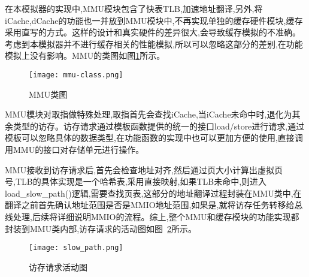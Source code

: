 

在本模拟器的实现中,MMU模块包含了快表TLB,加速地址翻译,另外,将iCache,dCache的功能也一并放到MMU模块中,不再实现单独的缓存硬件模块,缓存采用直写的方式。这样的设计和真实硬件的差异很大,会导致缓存模拟的不准确。考虑到本模拟器并不进行缓存相关的性能模拟,所以可以忽略这部分的差别,在功能模拟上没有影响。MMU的类图如图\ref{fig:mmu-class}所示。
\begin{figure}[H]
    \centering
    \texttt{[image: mmu-class.png]}
    \caption{MMU类图}
    \label{fig:mmu-class}
\end{figure}

MMU模块对取指做特殊处理,取指首先会查找iCache,当iCache未命中时,退化为其余类型的访存。访存请求通过模板函数提供的统一的接口load/store进行请求,通过模板可以忽略具体的数据类型,在功能函数的实现中也可以更加方便的使用,直接调用MMU的接口对存储单元进行操作。



MMU接收到访存请求后,首先会检查地址对齐,然后通过页大小计算出虚拟页号,TLB的具体实现是一个哈希表,采用直接映射,如果TLB未命中,则进入load\_slow\_path()逻辑,需要查找页表,这部分的地址翻译过程封装在MMU类中,在翻译之前首先确认地址范围是否是MMIO地址范围,如果是,就将访存任务转移给总线处理,后续将详细说明MMIO的流程。综上,整个MMU和缓存模块的功能实现都封装到MMU类内部,访存请求的活动图如图~\ref{fig:slow_path}所示。
\begin{figure}[H]
    \centering
    \texttt{[image: slow\_path.png]}
    \caption{访存请求活动图}
    \label{fig:slow_path}
\end{figure}

